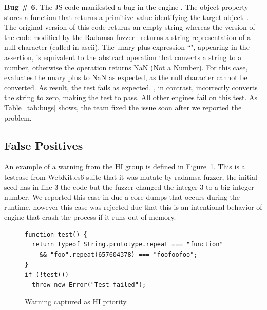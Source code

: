 \documentclass[10pt,conference,anonymous]{IEEEtran}
\begin{document}
 

\vspace{1ex}\noindent\textbf{Bug \# 6.} The JS code  
manifested a bug in the \js{} engine \chakra{}.  The object
property  stores a function that returns a primitive
value identifying the target object~\cite{valueof}. The original
version of this code returns an empty string whereas the version of
the code modified by the Radamsa fuzzer~\cite{radamsa} returns a string
representation of a null character (called  in ascii). The
unary plus expression ``", appearing in the assertion, is
equivalent to the abstract operation 
that converts a string to a number, otherwise the operation returns
NaN (Not a Number)\cite{unary-plus}. For this case, \chakra{} evaluates
the unary plus to NaN as expected, as the null character cannot be
converted. As result, the test fails as expected. \chakra{}, in contrast,
incorrectly converts the string to zero, making the test to pass. All
other engines fail on this test. As Table~\ref{tab:bugs} shows, the
\chakra{} team fixed the issue soon after we reported the problem.

\subsection{False Positives}

An example of a warning from the HI group is defined in Figure~\ref{fig:hi-priority}. 
This is a testcase from WebKit.es6 suite that it was mutate by radamsa fuzzer, the 
initial seed has in line 3 the code  but the fuzzer changed the 
integer 3 to a big integer number. We reported this case in \chakra{} due a core dumps that occurs
during the runtime, however this case was rejected due  that
this is an intentional behavior of engine that crash the process if it runs out of memory.

\begin{figure}[h!]
  \centering
  \scriptsize
  \begin{lstlisting}
function test() {
  return typeof String.prototype.repeat === "function"
    && "foo".repeat(657604378) === "foofoofoo";
}
if (!test())
  throw new Error("Test failed");
  \end{lstlisting}
  \normalsize
  \caption{Warning captured as HI priority.}
  \label{fig:hi-priority}
  \end{figure}
\end{document}
